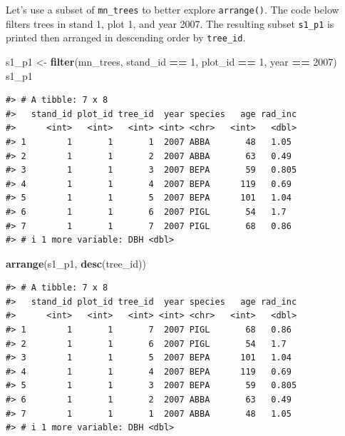 \documentclass[
  11pt,
]{krantz}
\newenvironment{Shaded}{\begin{snugshade}}{\end{snugshade}}
\newcommand{\DecValTok}[1]{\textcolor[rgb]{0.00,0.00,0.81}{#1}}
\newcommand{\KeywordTok}[1]{\textcolor[rgb]{0.13,0.29,0.53}{\textbf{#1}}}
\newcommand{\NormalTok}[1]{#1}
\newcommand{\OperatorTok}[1]{\textcolor[rgb]{0.81,0.36,0.00}{\textbf{#1}}}
\newcommand{\StringTok}[1]{\textcolor[rgb]{0.31,0.60,0.02}{#1}}
\theoremstyle{definition}
\theoremstyle{definition}
\theoremstyle{definition}
\theoremstyle{definition}
\theoremstyle{remark}
\begin{document}
Let's use a subset of \texttt{mn\_trees} to better explore \texttt{arrange()}. The code below filters trees in stand 1, plot 1, and year 2007. The resulting subset \texttt{s1\_p1} is printed then arranged in descending order by \texttt{tree\_id}.

\begin{Shaded}
\begin{Highlighting}[]
\NormalTok{s1\_p1 \textless{}{-}}\StringTok{ }\KeywordTok{filter}\NormalTok{(mn\_trees, stand\_id }\OperatorTok{==}\StringTok{ }\DecValTok{1}\NormalTok{, plot\_id }\OperatorTok{==}\StringTok{ }\DecValTok{1}\NormalTok{, }
\NormalTok{                year }\OperatorTok{==}\StringTok{ }\DecValTok{2007}\NormalTok{)}
\NormalTok{s1\_p1}
\end{Highlighting}
\end{Shaded}

\begin{verbatim}
#> # A tibble: 7 x 8
#>   stand_id plot_id tree_id  year species   age rad_inc
#>      <int>   <int>   <int> <int> <chr>   <int>   <dbl>
#> 1        1       1       1  2007 ABBA       48   1.05 
#> 2        1       1       2  2007 ABBA       63   0.49 
#> 3        1       1       3  2007 BEPA       59   0.805
#> 4        1       1       4  2007 BEPA      119   0.69 
#> 5        1       1       5  2007 BEPA      101   1.04 
#> 6        1       1       6  2007 PIGL       54   1.7  
#> 7        1       1       7  2007 PIGL       68   0.86 
#> # i 1 more variable: DBH <dbl>
\end{verbatim}

\begin{Shaded}
\begin{Highlighting}[]
\KeywordTok{arrange}\NormalTok{(s1\_p1, }\KeywordTok{desc}\NormalTok{(tree\_id))}
\end{Highlighting}
\end{Shaded}

\begin{verbatim}
#> # A tibble: 7 x 8
#>   stand_id plot_id tree_id  year species   age rad_inc
#>      <int>   <int>   <int> <int> <chr>   <int>   <dbl>
#> 1        1       1       7  2007 PIGL       68   0.86 
#> 2        1       1       6  2007 PIGL       54   1.7  
#> 3        1       1       5  2007 BEPA      101   1.04 
#> 4        1       1       4  2007 BEPA      119   0.69 
#> 5        1       1       3  2007 BEPA       59   0.805
#> 6        1       1       2  2007 ABBA       63   0.49 
#> 7        1       1       1  2007 ABBA       48   1.05 
#> # i 1 more variable: DBH <dbl>
\end{verbatim}
\end{document}
